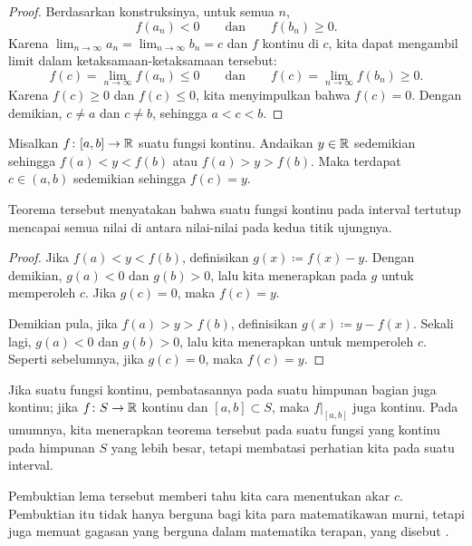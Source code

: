 \begin{proof}
Berdasarkan konstruksinya, untuk semua $n$,
\begin{equation*}
f(a_n) < 0
\qquad \text{dan} \qquad
f(b_n) \geq 0 .
\end{equation*}
Karena
$\lim_{n\to\infty} a_n = \lim_{n\to\infty} b_n = c$
dan $f$ kontinu di $c$, kita dapat mengambil
limit dalam ketaksamaan-ketaksamaan tersebut:
\begin{equation*}
f(c) = \lim_{n\to\infty} f(a_n) \leq 0
\qquad \text{dan} \qquad
f(c) = \lim_{n\to\infty} f(b_n) \geq 0 .
\end{equation*}
Karena $f(c) \geq 0$ dan
$f(c) \leq 0$, kita menyimpulkan bahwa $f(c) = 0$.
Dengan demikian, $c \neq a$ dan $c \neq b$, sehingga
$a < c < b$.
\end{proof}

\begin{thm} \label{IVT:thm}
Misalkan $f \colon [a,b] \to {\mathbb{R}}$ suatu fungsi kontinu.
Andaikan $y \in {\mathbb{R}}$ sedemikian sehingga $f(a) < y < f(b)$
atau $f(a) > y > f(b)$.  Maka terdapat $c \in (a,b)$
sedemikian sehingga $f(c) = y$.
\end{thm}

Teorema tersebut menyatakan bahwa suatu fungsi kontinu pada interval tertutup
mencapai semua nilai di antara nilai-nilai pada kedua titik ujungnya.

\begin{proof}
Jika $f(a) < y < f(b)$, definisikan $g(x) \coloneqq f(x)-y$.  Dengan demikian,
$g(a) < 0$ dan $g(b) > 0$, lalu kita menerapkan 
pada $g$ untuk memperoleh $c$.  Jika $g(c) = 0$, maka $f(c) = y$.

Demikian pula, jika $f(a) > y > f(b)$, definisikan $g(x) \coloneqq y-f(x)$.
Sekali lagi, $g(a) < 0$ dan $g(b) > 0$, lalu kita menerapkan  untuk
memperoleh $c$.
Seperti sebelumnya, jika $g(c) = 0$, maka $f(c) = y$.
\end{proof}

Jika suatu fungsi kontinu, pembatasannya
pada suatu himpunan bagian juga kontinu; jika $f \colon S \to {\mathbb{R}}$ kontinu dan
$[a,b] \subset S$, maka $f|_{[a,b]}$ juga kontinu.  Pada umumnya, kita
menerapkan teorema tersebut pada suatu fungsi yang kontinu pada himpunan $S$ yang lebih besar,
tetapi membatasi perhatian kita pada suatu interval.


Pembuktian lema tersebut memberi tahu kita cara menentukan akar $c$.
Pembuktian itu tidak hanya berguna bagi kita para matematikawan murni,
tetapi juga memuat gagasan yang berguna dalam matematika terapan,
yang disebut \emph{}.


